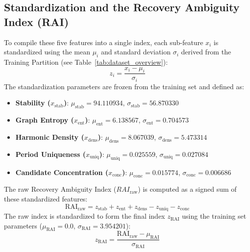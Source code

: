 \subsection{Standardization and the Recovery Ambiguity Index (RAI)} \label{sec:method_standardization}
To compile these five features into a single index, each sub-feature $x_i$ is standardized using the mean $\mu_i$ and standard deviation $\sigma_i$ derived from the Training Partition (see Table~\ref{tab:dataset_overview}):
\begin{equation}
z_i = \frac{x_i - \mu_i}{\sigma_i}
\label{eq:zscore}
\end{equation}
The standardization parameters are frozen from the training set and defined as:
\begin{itemize}
\item \textbf{Stability ($x_{\text{stab}}$)}: $\mu_{\text{stab}} = 94.110934$, $\sigma_{\text{stab}} = 56.870330$
\item \textbf{Graph Entropy ($x_{\text{ent}}$)}: $\mu_{\text{ent}} = 6.138567$, $\sigma_{\text{ent}} = 0.704573$
\item \textbf{Harmonic Density ($x_{\text{dens}}$)}: $\mu_{\text{dens}} = 8.067039$, $\sigma_{\text{dens}} = 5.473314$
\item \textbf{Period Uniqueness ($x_{\text{uniq}}$)}: $\mu_{\text{uniq}} = 0.025559$, $\sigma_{\text{uniq}} = 0.027084$
\item \textbf{Candidate Concentration ($x_{\text{conc}}$)}: $\mu_{\text{conc}} = 0.015774$, $\sigma_{\text{conc}} = 0.006686$
\end{itemize}

The raw Recovery Ambiguity Index ($RAI_{\text{raw}}$) is computed as a signed sum of these standardized features:
\begin{equation}
\text{RAI}_{\text{raw}} = z_{\text{stab}} + z_{\text{ent}} + z_{\text{dens}} - z_{\text{uniq}} - z_{\text{conc}}
\label{eq:raw_rai}
\end{equation}
The raw index is standardized to form the final index $z_{\text{RAI}}$ using the training set parameters ($\mu_{\text{RAI}} = 0.0$, $\sigma_{\text{RAI}} = 3.954201$):
\begin{equation}
z_{\text{RAI}} = \frac{\text{RAI}_{\text{raw}} - \mu_{\text{RAI}}}{\sigma_{\text{RAI}}}
\label{eq:rai_final}
\end{equation}

